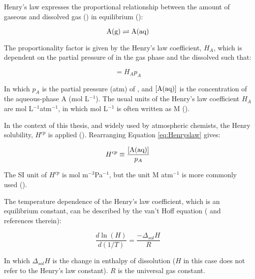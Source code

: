 \medskip

Henry's law expresses the proportional relationship between the amount of gaseous and dissolved gas () in equilibrium (\cite{SeinfeldSpyros}): 

\begin{equation*}
    \mathrm{A(g)} \rightleftharpoons \mathrm{A(aq)}
\end{equation*}

The proportionality factor is given by the Henry's law coefficient, $H_A$, which is dependent on the partial pressure of  in the gas phase and the dissolved  such that: 

\begin{equation}
    [\chem{A(aq)}] = H_Ap_A
    \label{eq:Henryslaw}
\end{equation}

In which $p_A$ is the partial pressure (atm) of , and $[\mathrm{A(aq)}]$ is the concentration of the aqueous-phase A (mol L$^{-1}$). The usual units of the Henry's law coefficient $H_A$ are mol L$^{-1}$atm$^{-1}$, in which mol L$^{-1}$ is often written as M (\cite{SeinfeldSpyros}).

\medskip

In the context of this thesis, and widely used by atmospheric chemists, the Henry solubility, $H^{cp}$ is applied (\cite{Sander2015}). Rearranging Equation \ref{eq:Henryslaw} gives: 

\begin{equation}
    H^{cp} \equiv \frac{[\mathrm{A(aq)}]}{p_A}
    \label{eq:HenrySol}
\end{equation}

The SI unit of $H^{cp}$ is mol m$^{-3}$Pa$^{-1}$, but the unit M atm$^{-1}$ is more commonly used (\cite{Sander2015}).

\medskip

The temperature dependence of the Henry's law coefficient, which is an equilibrium constant, can be described by the van't Hoff equation (\cite{Sander2015} and references therein): 

\begin{equation*}
    \frac{d\ln(H)}{d(1/T)} = \frac{-\Delta_{sol}H}{R}
    \label{eq:vantHoff}
\end{equation*}

In which $\Delta_{sol}H$ is the change in enthalpy of dissolution ($H$ in this case does not refer to the Henry's law constant). $R$ is the universal gas constant. 

\medskip

